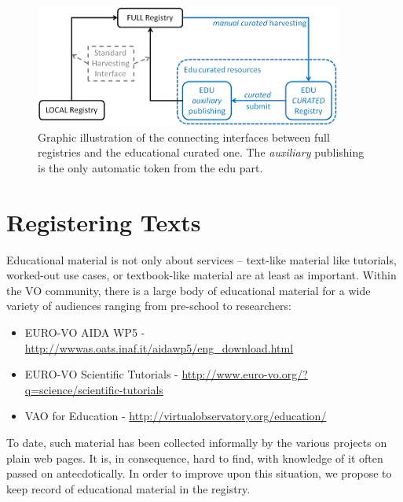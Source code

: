 \documentclass{ivoa}
\begin{document}
\begin{figure}

\includegraphics[width=0.9\textwidth]{curation.png}
\caption{Graphic illustration
    of the connecting interfaces between full registries and the educational
    curated one. The 
\emph{auxiliary}
 publishing is the only automatic token
    from the edu part.}
\label{fig:curation}
\end{figure}

\section{Registering Texts}

\label{sect:regext}

Educational material is not only about services – text-like material
like tutorials, worked-out use cases, or textbook-like material are at
least as important.  Within the VO community, there is a large body of
educational material for a wide variety of audiences ranging from pre-school to
researchers:

\begin{itemize}

\item EURO-VO AIDA WP5 - \url{http://wwwas.oats.inaf.it/aidawp5/eng_download.html}

\item EURO-VO Scientific Tutorials - \url{http://www.euro-vo.org/?q=science/scientific-tutorials}

\item VAO for Education - \url{http://virtualobservatory.org/education/}

\end{itemize}


To date, such material has been collected informally by the various
projects on plain web pages.  It is, in consequence, hard to find, with
knowledge of it often passed on antecdotically. In order to improve upon 
this situation, we
propose to keep record of educational material in the registry.
\end{document}
